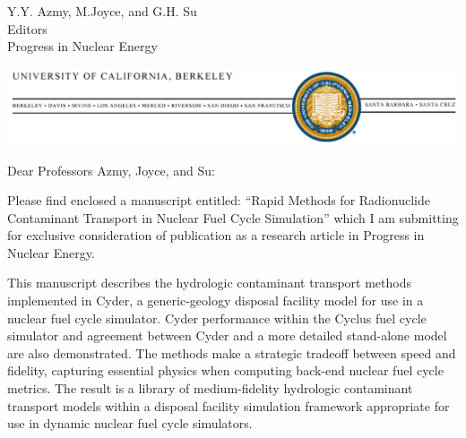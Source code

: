 \documentclass[10pt]{letter} %
\begin{document}

\begin{letter}{Y.Y. Azmy, M.Joyce, and G.H. Su\\
Editors\\
Progress in Nuclear Energy}


\vspace{-2cm}
\begin{center}
\includegraphics[width=\textwidth]{bk_logo.eps}
\end{center}

\address{Department of Nuclear Engineering\\
4155 Etcheverry Hall\\
MC 1730\\
University of California, Berkeley\\
Berkeley, CA 94720-1730}



\opening{Dear Professors Azmy, Joyce, and Su:}

Please find enclosed a manuscript entitled: ``Rapid Methods for Radionuclide
Contaminant Transport in Nuclear Fuel Cycle Simulation'' which I am submitting
for exclusive consideration of publication as a research article in Progress in
Nuclear Energy.

This manuscript describes the hydrologic contaminant transport methods
implemented in Cyder, a generic-geology disposal facility model for use in a
nuclear fuel cycle simulator. Cyder performance within the Cyclus fuel cycle
simulator and agreement between Cyder and a more detailed stand-alone model are
also demonstrated. The methods make a strategic tradeoff between speed and
fidelity, capturing essential physics when computing back-end nuclear fuel
cycle metrics. The result is a library of medium-fidelity hydrologic
contaminant transport models within a disposal facility simulation framework
appropriate for use in dynamic nuclear fuel cycle simulators.


\end{letter}
\end{document}
